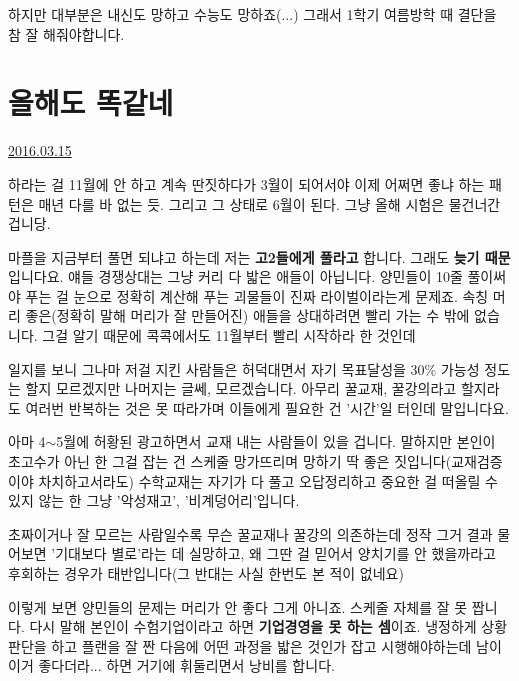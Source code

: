 하지만 대부분은 내신도 망하고 수능도 망하죠(...)
그래서 1학기 여름방학 때 결단을 참 잘 해줘야합니다.
\vspace{5mm}






\section{올해도 똑같네}
\href{https://www.kockoc.com/Apoc/677337}{2016.03.15}

\vspace{5mm}

하라는 걸 11월에 안 하고 계속 딴짓하다가 3월이 되어서야 이제 어쩌면 좋냐 하는 패턴은 매년 다를 바 없는 듯.
그리고 그 상태로 6월이 된다. 그냥 올해 시험은 물건너간 겁니당.
\vspace{5mm}

마플을 지금부터 풀면 되냐고 하는데
저는 \textbf{고2들에게 풀라고} 합니다. 그래도 \textbf{늦기 때문}입니다요.
얘들 경쟁상대는 그냥 커리 다 밟은 애들이 아닙니다.
양민들이 10줄 풀이써야 푸는 걸 눈으로 정확히 계산해 푸는 괴물들이 진짜 라이벌이라는게 문제죠.
속칭 머리 좋은(정확히 말해 머리가 잘 만들어진) 애들을 상대하려면 빨리 가는 수 밖에 없습니다.
그걸 알기 때문에 콕콕에서도 11월부터 빨리 시작하라 한 것인데
\vspace{5mm}

일지를 보니 그나마 저걸 지킨 사람들은 허덕대면서 자기 목표달성을 30$\%$ 가능성 정도는 할지 모르겠지만
나머지는 글쎄, 모르겠습니다.  아무리 꿀교재, 꿀강의라고 할지라도 여러번 반복하는 것은 못 따라가며
이들에게 필요한 건 '시간'일 터인데 말입니다요.
\vspace{5mm}

아마 4$\sim$5월에 허황된 광고하면서 교재 내는 사람들이 있을 겁니다.
말하지만 본인이 초고수가 아닌 한 그걸 잡는 건 스케줄 망가뜨리며 망하기 딱 좋은 짓입니다(교재검증이야 차치하고서라도)
수학교재는 자기가 다 풀고 오답정리하고 중요한 걸 떠올릴 수 있지 않는 한 그냥 '악성재고', '비계덩어리'입니다.
\vspace{5mm}

초짜이거나 잘 모르는 사람일수록 무슨 꿀교재나 꿀강의 의존하는데 정작 그거 결과 물어보면 '기대보다 별로'라는 데 실망하고,
왜 그딴 걸 믿어서 양치기를 안 했을까라고 후회하는 경우가 태반입니다(그 반대는 사실 한번도 본 적이 없네요)
\vspace{5mm}

이렇게 보면 양민들의 문제는 머리가 안 좋다 그게 아니죠.
스케줄 자체를 잘 못 짭니다. 다시 말해 본인이 수험기업이라고 하면 \textbf{기업경영을 못 하는 셈}이죠.
냉정하게 상황판단을 하고 플랜을 잘 짠 다음에 어떤 과정을 밟은 것인가 잡고 시행해야하는데
남이 이거 좋다더라... 하면 거기에 휘둘리면서 낭비를 합니다.
\vspace{5mm}

